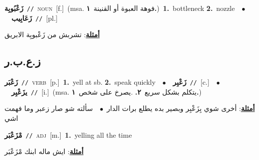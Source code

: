 \documentclass[10pt,a4paper,twoside]{article} %
\begin{document}
\begin{multicols}{2}
{\setlength\topsep{0pt}\textbf{\foreignlanguage{arabic}{زَعْبُوبِة}}\ {\color{gray}\texttt{//}\color{black}}\ \textsc{noun}\ [f.]\ \color{gray}(msa. \foreignlanguage{arabic}{فوهة العبوة أو القنينة}~\foreignlanguage{arabic}{\textbf{١.}})\color{black}\ \textbf{1.}~bottleneck  \textbf{2.}~nozzle\ \ $\bullet$\ \ \setlength\topsep{0pt}\textbf{\foreignlanguage{arabic}{زَعَابِيب}}\ {\color{gray}\texttt{//}\color{black}}\ [pl.]\  \begin{flushright}\color{gray}\foreignlanguage{arabic}{\textbf{\underline{\foreignlanguage{arabic}{أمثلة}}}: تشربش من زَعْبوبِة الابريق}\end{flushright}\color{black}} \vspace{2mm}

\vspace{-3mm}
\subsection*{\color{blue}\foreignlanguage{arabic}{ز.ع.ب.ر}\color{blue}{}} 

{\setlength\topsep{0pt}\textbf{\foreignlanguage{arabic}{زَعْبَر}}\ {\color{gray}\texttt{//}\color{black}}\ \textsc{verb}\ [p.]\ \textbf{1.}~yell at sb.  \textbf{2.}~speak quickly\ \ $\bullet$\ \ \setlength\topsep{0pt}\textbf{\foreignlanguage{arabic}{زَعْبِر}}\ {\color{gray}\texttt{//}\color{black}}\ [c.]\ \ $\bullet$\ \ \setlength\topsep{0pt}\textbf{\foreignlanguage{arabic}{يزَعْبِر}}\ {\color{gray}\texttt{//}\color{black}}\ [i.]\ \color{gray}(msa. \foreignlanguage{arabic}{يتكلم بشكل سريع}~\foreignlanguage{arabic}{\textbf{٢.}}  .\foreignlanguage{arabic}{يصرخ على شخص}~\foreignlanguage{arabic}{\textbf{١.}})\color{black}\  \begin{flushright}\color{gray}\foreignlanguage{arabic}{\textbf{\underline{\foreignlanguage{arabic}{أمثلة}}}: أخرى شوي بِزَعْبِر وبصير بده يطلع برات الدار\ $\bullet$\ \  سألته شو صار زعبر وما فهمت اشي}\end{flushright}\color{black}} \vspace{2mm}

{\setlength\topsep{0pt}\textbf{\foreignlanguage{arabic}{مْزَعْبَر}}\ {\color{gray}\texttt{//}\color{black}}\ \textsc{adj}\ [m.]\ \textbf{1.}~yelling all the time\  \begin{flushright}\color{gray}\foreignlanguage{arabic}{\textbf{\underline{\foreignlanguage{arabic}{أمثلة}}}: ايش ماله ابنك مْزَعْبَر}\end{flushright}\color{black}} \vspace{2mm}


\end{multicols}
\end{document}

